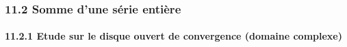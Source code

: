 

\subsubsection{11.2 Somme d'une série entière}

\paragraph{11.2.1 Etude sur le disque ouvert de convergence (domaine
		complexe)}
%
%
%
%
